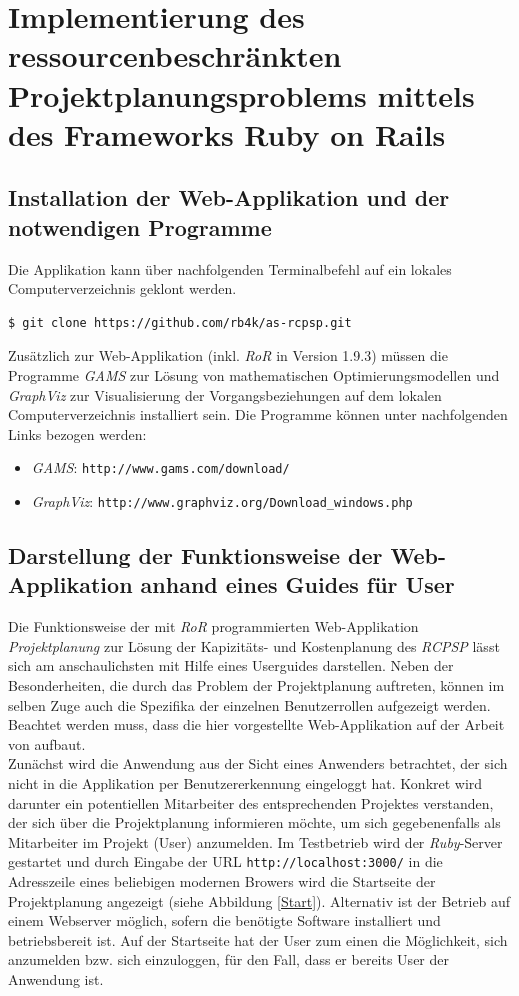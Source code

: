 \documentclass[a4paper,12pt,parskip,bibtotoc,liststotoc]{article}
\begin{document}
\section{Implementierung des ressourcenbeschränkten Projektplanungsproblems mittels des Frameworks Ruby on Rails} \label{Haupt}
\subsection{Installation der Web-Applikation und der notwendigen Programme}
Die Applikation kann über nachfolgenden Terminalbefehl auf ein lokales Computerverzeichnis geklont werden.
\begin{lstlisting}[style=Befehl]
$ git clone https://github.com/rb4k/as-rcpsp.git
\end{lstlisting}
Zusätzlich zur Web-Applikation (inkl. \textit{RoR} in Version 1.9.3) müssen die Programme \textit{GAMS} zur Lösung von mathematischen Optimierungsmodellen und \textit{GraphViz} zur Visualisierung der Vorgangsbeziehungen auf dem lokalen Computerverzeichnis installiert sein. Die Programme können unter nachfolgenden Links bezogen werden:
\begin{itemize}
\item \textit{GAMS}: \texttt{http://www.gams.com/download/}
\item \textit{GraphViz}: \texttt{http://www.graphviz.org/Download\_windows.php}
\end{itemize}

\subsection{Darstellung der Funktionsweise der Web-Applikation anhand eines Guides für User}\label{User}
Die Funktionsweise der mit \textit{RoR} programmierten Web-Applikation \textit{\glqq Projektplanung\grqq} zur Lösung der Kapizitäts- und Kostenplanung des \textit{RCPSP} lässt sich am anschaulichsten mit Hilfe eines Userguides darstellen. 
Neben der Besonderheiten, die durch das Problem der Projektplanung auftreten, können im selben Zuge auch die Spezifika der einzelnen Benutzerrollen aufgezeigt werden. Beachtet werden muss, dass die hier vorgestellte Web-Applikation auf der Arbeit von \cite{hartl2012ruby} aufbaut.\\

Zunächst wird die Anwendung aus der Sicht eines Anwenders betrachtet, der sich nicht in die Applikation per Benutzererkennung eingeloggt hat. Konkret wird darunter ein potentiellen Mitarbeiter des entsprechenden Projektes verstanden, der sich über die Projektplanung informieren möchte, um sich gegebenenfalls als Mitarbeiter im Projekt (User) anzumelden. Im Testbetrieb wird der \textit{Ruby}-Server gestartet und durch Eingabe der URL \texttt{http://localhost:3000/} in die Adresszeile eines beliebigen modernen Browers wird die Startseite der Projektplanung angezeigt (siehe Abbildung \ref{Start}). Alternativ ist der Betrieb auf einem Webserver möglich, sofern die benötigte Software installiert und betriebsbereit ist. Auf der Startseite hat der User zum einen die Möglichkeit, sich anzumelden bzw. sich einzuloggen, für den Fall, dass er bereits User der Anwendung ist. \\
\end{document}
